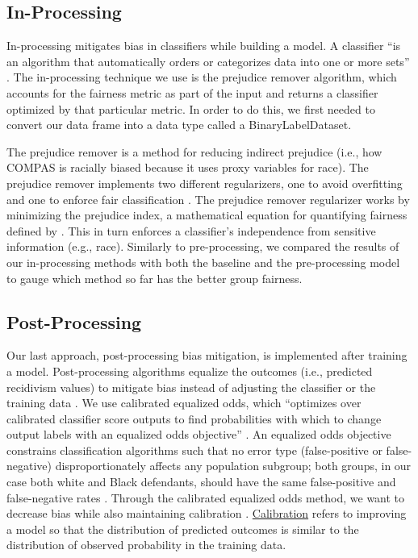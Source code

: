 \documentclass[water,article,submit,moreauthors,pdftex]{mdpi}
\begin{document}
\hypertarget{in-processing}{%
\subsection{In-Processing}\label{in-processing}}

In-processing mitigates bias in classifiers while building a model. A
classifier ``is an algorithm that automatically orders or categorizes
data into one or more sets'' \citep{baxter2021AI}. The in-processing
technique we use is the prejudice remover algorithm, which accounts for
the fairness metric as part of the input and returns a classifier
optimized by that particular metric. In order to do this, we first
needed to convert our data frame into a data type called a
BinaryLabelDataset.

The prejudice remover is a method for reducing indirect prejudice (i.e.,
how COMPAS is racially biased because it uses proxy variables for race).
The prejudice remover implements two different regularizers, one to
avoid overfitting and one to enforce fair classification
\citep{kamishima2012fairness}. The prejudice remover regularizer works
by minimizing the prejudice index, a mathematical equation for
quantifying fairness defined by \citet{kamishima2012fairness}. This in
turn enforces a classifier's independence from sensitive information
(e.g., race). Similarly to pre-processing, we compared the results of
our in-processing methods with both the baseline and the pre-processing
model to gauge which method so far has the better group fairness.

\hypertarget{post-processing}{%
\subsection{Post-Processing}\label{post-processing}}

Our last approach, post-processing bias mitigation, is implemented after
training a model. Post-processing algorithms equalize the outcomes
(i.e., predicted recidivism values) to mitigate bias instead of
adjusting the classifier or the training data \citep{baxter2021AI}. We
use calibrated equalized odds, which ``optimizes over calibrated
classifier score outputs to find probabilities with which to change
output labels with an equalized odds objective''
\citep{aif360-oct-2018}. An equalized odds objective constrains
classification algorithms such that no error type (false-positive or
false-negative) disproportionately affects any population subgroup; both
groups, in our case both white and Black defendants, should have the
same false-positive and false-negative rates \citep{pleiss2017fairness}.
Through the calibrated equalized odds method, we want to decrease bias
while also maintaining calibration \citep{pleiss2017fairness}.
\href{https://medium.com/analytics-vidhya/calibration-in-machine-learning-e7972ac93555}{Calibration}
refers to improving a model so that the distribution of predicted
outcomes is similar to the distribution of observed probability in the
training data.
\end{document}
